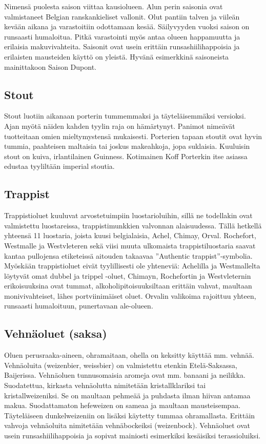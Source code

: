 \documentclass[a4paper,11pt]{report}
\begin{document}
Nimensä puolesta saison viittaa kausiolueen. Alun perin saisonia ovat valmistaneet Belgian ranskankieliset vallonit. Olut pantiin talven ja viileän kevään aikana ja varastoitiin odottamaan kesää. Säilyvyyden vuoksi saison on runsaasti humaloitua. Pitkä varastointi myös antaa olueen happamuutta ja erilaisia makuvivahteita. Saisonit ovat usein erittäin runsashiilihappoisia ja erilaisten mausteiden käyttö on yleistä. Hyvänä esimerkkinä saisoneista mainittakoon Saison Dupont.

\subsection*{Stout}

Stout luotiin aikanaan porterin tummemmaksi ja täyteläisemmäksi versioksi. Ajan myötä näiden kahden tyylin raja on hämärtynyt. Panimot nimeävät tuotteitaan omien mieltymystensä mukaisesti. Porterien tapaan stoutit ovat hyvin tummia, paahteisen maltaisia tai joskus makeahkoja, jopa suklaisia. Kuuluisin stout on kuiva, irlantilainen Guinness. Kotimainen Koff Porterkin itse asiassa edustaa tyyliltään imperial stoutia.

\subsection*{Trappist}

Trappistioluet kuuluvat arvostetuimpiin luostarioluihin, sillä ne todellakin ovat valmistettu luostareissa, trappistimunkkien valvonnan alaisuudessa. Tällä hetkellä yhteensä 11 luostaria, joista kuusi belgialaisia, Achel, Chimay, Orval. Rochefort, Westmalle ja Westvleteren sekä viisi muuta ulkomaista trappistiluostaria saavat kantaa pullojensa etiketeissä aitouden takaavaa ''Authentic trappist''-symbolia. Myöskään trappistioluet eivät tyylillisesti ole yhteneviä: Achelilla ja Westmallelta löytyvät omat dubbel ja trippel -oluet, Chimayn, Rochefortin ja Westvleternin erikoisuuksina ovat tummat, alkoholipitoisuuksiltaan erittäin vahvat, maultaan monivivahteiset, lähes portviinimäiset oluet. Orvalin valikoima rajoittuu yhteen, runsaasti humaloituun, punertavaan ale-olueen.

\subsection*{Vehnäoluet (saksa)}

Oluen perusraaka-aineen, ohramaitaan, ohella on keksitty käyttää mm. vehnää. Vehnäoluita (weizenbier, weissbier) on valmistettu etenkin Etelä-Saksassa, Baijerissa. Vehnäoluen tunnusomaisia aromeja ovat mm. banaani ja neilikka. Suodatettua, kirkasta vehnäolutta nimitetään kristallklariksi tai kristallweizeniksi. Se on maultaan pehmeää ja puhdasta ilman hiivan antamaa makua. Suodattamaton hefeweizen on sameaa ja maultaan mausteisempaa. Täyteläiseen dunkelweizeniin on lisäksi käytetty tummaa ohramallasta. Erittäin vahvoja vehnäoluita nimitetään vehnäbockeiksi (weizenbock). Vehnäoluet ovat usein runsashiilihappoisia ja sopivat mainiosti esimerkiksi kesäisiksi terassioluiksi.
\end{document}
